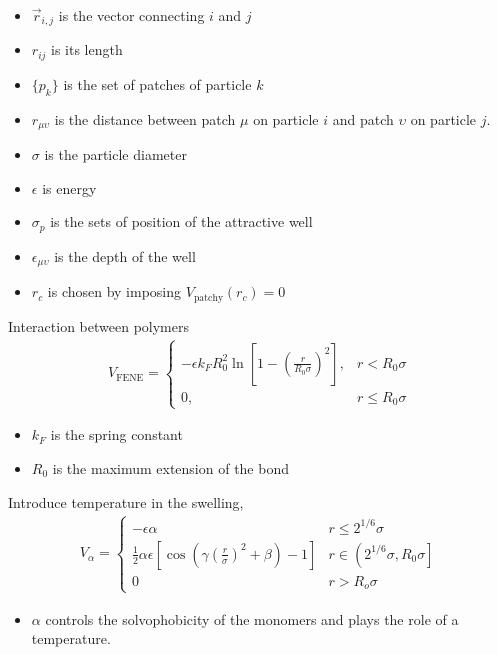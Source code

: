 \documentclass[main.tex]{subfiles}
\begin{document}
\begin{itemize}
	\item $\vec{r}_{i,j}$ is the vector connecting $i$ and $j$
	\item $r_{ij}$ is its length
	\item $\{p_k\}$ is the set of patches of particle $k$
	\item $r_{\mu\upsilon}$ is the distance between patch $\mu$ on particle $i$ and patch $\upsilon$ on particle $j$.
	\item $\sigma$ is the particle diameter
	\item $\epsilon$ is energy
	\item $\sigma_p$ is the sets of position of the attractive well
	\item $\epsilon_{\mu\upsilon}$ is the depth of the well
	\item $r_c$ is chosen by imposing $V_{\mathrm{patchy}}(r_c)=0$
\end{itemize}


Interaction between polymers
\begin{gather}
	V_{\mathrm{FENE}} = \left\{
	\begin{array}{cc}
		-\epsilon k_F R_0^2\ln\left[1-\left(\frac{r}{R_0\sigma}\right)^2\right], & r<R_0\sigma \\
		0, & r\leq R_0\sigma
	\end{array}
	\right.
\end{gather}

\begin{itemize}
	\item $k_F$ is the spring constant
	\item $R_0$ is the maximum extension of the bond
\end{itemize}

Introduce temperature in the swelling,
\begin{gather}
	V_\alpha = \left\{
	\begin{array}{ll}
		-\epsilon\alpha & r\leq2^{1/6}\sigma \\
		\frac{1}{2}\alpha\epsilon\left[\cos\left(\gamma\left(\frac{r}{\sigma}\right)^2 +\beta\right)-1\right] & r\in\left(2^{1/6}\sigma,R_0\sigma\right] \\
		0 & r>R_o\sigma
	\end{array}
	\right.
\end{gather}

\begin{itemize}
	\item $\alpha$ controls the solvophobicity of the monomers and plays the role of a temperature.
\end{itemize}




\end{document}
